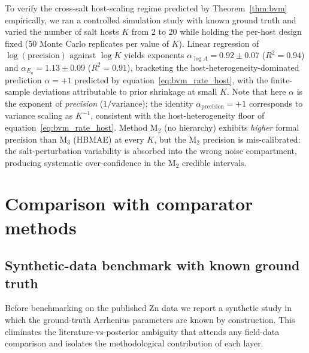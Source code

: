 \documentclass[12pt]{article}
\theoremstyle{plain}
\theoremstyle{definition}
\theoremstyle{remark}
\newcommand{\HBMAE}{HBMAE\xspace}
\begin{document}
To verify the cross-salt host-scaling regime predicted by
Theorem~\ref{thm:bvm} empirically, we ran a controlled simulation study with
known ground truth and varied the number of salt hosts $K$ from 2 to 20
while holding the per-host design fixed (50 Monte Carlo replicates per
value of $K$).  Linear regression of $\log(\text{precision})$ against
$\log K$ yields exponents $\alpha_{\log A} = 0.92\pm 0.07$
($R^2 = 0.94$) and $\alpha_{E_a} = 1.13\pm 0.09$ ($R^2 = 0.91$),
bracketing the host-heterogeneity-dominated prediction $\alpha = +1$
predicted by equation~\eqref{eq:bvm_rate_host}, with the finite-sample
deviations attributable to prior shrinkage at small $K$.  Note that here
$\alpha$ is the exponent of \emph{precision} ($1/\mathrm{variance}$); the
identity $\alpha_{\mathrm{precision}}=+1$ corresponds to variance scaling
as $K^{-1}$, consistent with the host-heterogeneity floor of
equation~\eqref{eq:bvm_rate_host}.  Method M$_2$ (no hierarchy) exhibits
\emph{higher} formal precision than M$_3$ (\HBMAE) at every $K$, but the
M$_2$ precision is mis-calibrated:  the salt-perturbation variability is
absorbed into the wrong noise compartment, producing systematic
over-confidence in the M$_2$ credible intervals.

\section{Comparison with comparator methods}\label{sec:comparison}

\subsection{Synthetic-data benchmark with known ground truth}\label{sec:comparison:synth}

Before benchmarking on the published Zn data we report a synthetic
study in which the ground-truth Arrhenius parameters are known by
construction.  This eliminates the literature-vs-posterior ambiguity that
attends any field-data comparison and isolates the methodological
contribution of each layer.
\end{document}
